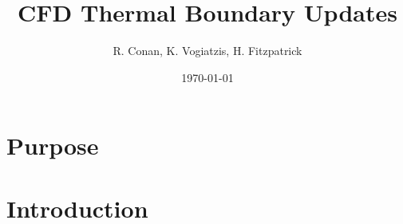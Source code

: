 \documentclass{gmto}
\title{CFD Thermal Boundary Updates}
\author{R. Conan, K. Vogiatzis, H. Fitzpatrick}
\date{\today}
\begin{document}
\maketitle
\tableofcontents
\listoffigures
\listoftables

\clearpage

\section{Purpose}
\label{sec:purpose}

\section{Introduction}
\label{sec:introduction}



\printbibliography
\end{document}
